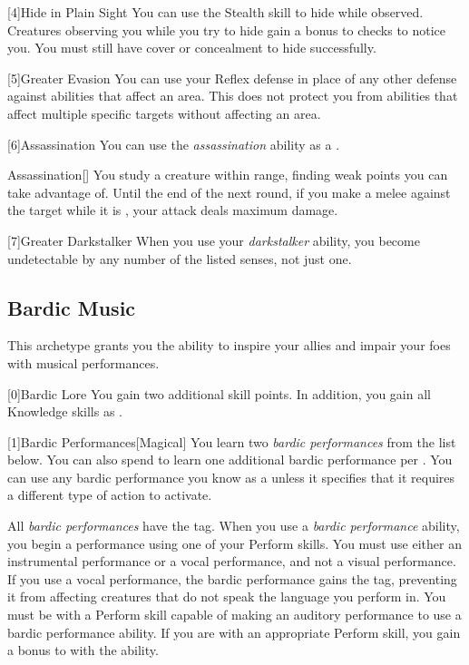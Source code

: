         [4]{Hide in Plain Sight} You can use the Stealth skill to hide while observed.
        Creatures observing you while you try to hide gain a  bonus to checks to notice you.
        You must still have cover or concealment to hide successfully.

        [5]{Greater Evasion} You can use your Reflex defense in place of any other defense against abilities that affect an area.
        This does not protect you from abilities that affect multiple specific targets without affecting an area.

        [6]{Assassination} You can use the \textit{assassination} ability as a .
        \begin{freeability}{Assassination}[]
            You study a creature within \rngmed range, finding weak points you can take advantage of.
            Until the end of the next round, if you make a melee  against the target while it is \unaware, your attack deals maximum damage.
        \end{freeability}

        [7]{Greater Darkstalker} When you use your \textit{darkstalker} ability, you become undetectable by any number of the listed senses, not just one.

    \newpage
    \subsection{Bardic Music}
        This archetype grants you the ability to inspire your allies and impair your foes with musical performances.

        [0]{Bardic Lore} You gain two additional skill points.
        In addition, you gain all Knowledge skills as .

        [1]{Bardic Performances}[Magical]
        You learn two \textit{bardic performances} from the list below.
        You can also spend  to learn one additional bardic performance per .
        You can use any bardic performance you know as a  unless it specifies that it requires a different type of action to activate.

        All \textit{bardic performances} have the  tag.
        When you use a \textit{bardic performance} ability, you begin a performance using one of your Perform skills.
        You must use either an instrumental performance or a vocal performance, and not a visual performance.
        If you use a vocal performance, the bardic performance gains the  tag, preventing it from affecting creatures that do not speak the language you perform in.
        You must be  with a Perform skill capable of making an auditory performance to use a bardic performance ability.
        If you are  with an appropriate Perform skill, you gain a  bonus to  with the ability.

